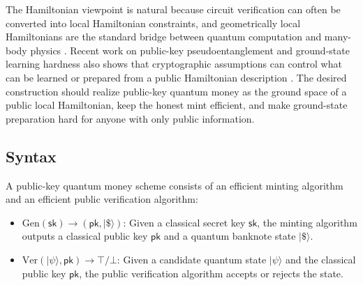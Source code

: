 \documentclass[12pt]{article}
\begin{document}
The Hamiltonian viewpoint is natural because circuit verification can often be converted into local Hamiltonian constraints, and geometrically local Hamiltonians are the standard bridge between quantum computation and many-body physics \cite{gottesmanQuantumClassicalComplexity2010}.
Recent work on public-key pseudoentanglement and ground-state learning hardness also shows that cryptographic assumptions can control what can be learned or prepared from a public Hamiltonian description \cite{boulandPublickeyPseudoentanglementHardness2023,boulandHardnessLearningGround2024}.
The desired construction should realize public-key quantum money as the ground space of a public local Hamiltonian, keep the honest mint efficient, and make ground-state preparation hard for anyone with only public information.

\subsection{Syntax}
A public-key quantum money scheme consists of an efficient minting algorithm and an efficient public verification algorithm:
\begin{itemize}
    \item $\mathrm{Gen}(\mathsf{sk}) \to (\mathsf{pk}, |\$\rangle)$: Given a classical secret key $\mathsf{sk}$, the minting algorithm outputs a classical public key $\mathsf{pk}$ and a quantum banknote state $|\$\rangle$.
    \item $\mathrm{Ver}(|\psi\rangle,\mathsf{pk}) \to \top / \bot$: Given a candidate quantum state $|\psi\rangle$ and the classical public key $\mathsf{pk}$, the public verification algorithm accepts or rejects the state.
\end{itemize}
\end{document}
